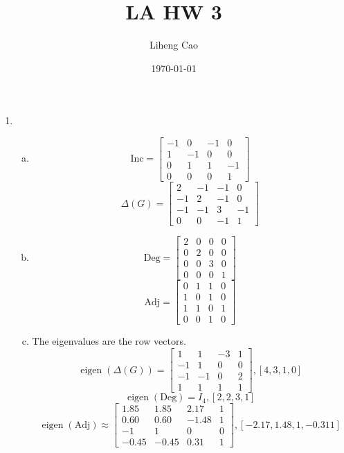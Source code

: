 \documentclass[12pt]{article}
\title{LA HW 3} %
\author{Liheng Cao} %
\date{\today} %
\begin{document}
\maketitle

\section{} %
\begin{enumerate}[G1]
	\item \,
		\begin{enumerate}[(a)]
			\item 
				\[\mathrm{Inc} = 
					\begin{bmatrix}
						-1 & 0 & -1 & 0\\
						1 & -1 & 0 & 0\\
						0 & 1 & 1 & -1\\
						0 & 0 & 0 & 1
					\end{bmatrix}
				\]
				\[
					\Delta(G) = 
					\begin{bmatrix}
						2 & -1 & -1 & 0\\
						-1 & 2 & -1 & 0\\
						-1 & -1 & 3 & -1\\
						0 & 0 & -1 & 1
					\end{bmatrix}
				\]
				
			\item 
				\[\mathrm{Deg} = 
					\begin{bmatrix}
						2 & 0 & 0 & 0\\
						0 & 2 & 0 & 0\\
						0 & 0 & 3 & 0\\
						0 & 0 & 0 & 1
					\end{bmatrix}\]
				\[\mathrm{Adj} = 
					\begin{bmatrix}
						0 & 1 & 1 & 0\\
						1 & 0 & 1 & 0\\
						1 & 1 & 0 & 1\\
						0 & 0 & 1 & 0
					\end{bmatrix}\]
			\item The eigenvalues are the row vectors.
				\[\operatorname{eigen}(\Delta(G)) = 
					\begin{bmatrix}
						1 & 1 & -3 & 1\\
						-1 & 1 & 0 & 0\\
						-1 & -1 & 0 & 2\\
						1 & 1 & 1 & 1
					\end{bmatrix},
					[4,3,1,0]
				\]
				\[
					\operatorname{eigen}(\mathrm{Deg}) = I_4, [2,2,3,1]
				\]
				\[
					\operatorname{eigen}(\mathrm{Adj}) \approx
					\begin{bmatrix}
						1.85 & 1.85 & 2.17 & 1\\
						0.60 & 0.60 & -1.48 & 1\\
						-1 & 1 & 0 & 0\\
						-0.45 & -0.45 & 0.31 & 1
					\end{bmatrix} , 
					[-2.17, 1.48, 1, -0.311]
				\]
			

\end{enumerate}
\end{enumerate}
\end{document}
